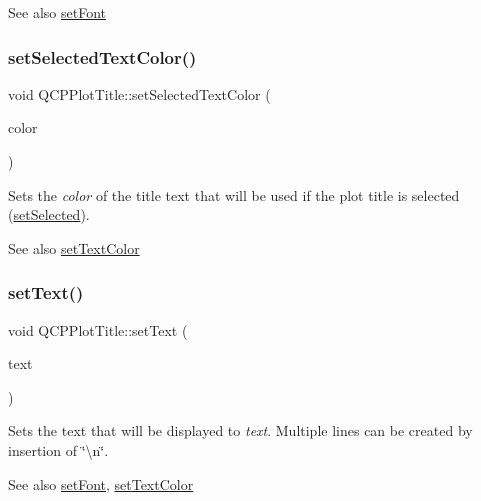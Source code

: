 \begin{DoxySeeAlso}{See also}
\mbox{\hyperlink{class_q_c_p_plot_title_a199fc7170802ea65006c371875349e37}{set\+Font}} 
\end{DoxySeeAlso}
\mbox{\label{class_q_c_p_plot_title_a09ffd8c52ac8824d00382f84be391b66}} 
\subsubsection{\texorpdfstring{set\+Selected\+Text\+Color()}{setSelectedTextColor()}}
{\footnotesize\ttfamily void Q\+C\+P\+Plot\+Title\+::set\+Selected\+Text\+Color (\begin{DoxyParamCaption}\item[{const Q\+Color \&}]{color }\end{DoxyParamCaption})}

Sets the {\itshape color} of the title text that will be used if the plot title is selected (\mbox{\hyperlink{class_q_c_p_plot_title_a8d441a889d371307df86f1ab7687a333}{set\+Selected}}).

\begin{DoxySeeAlso}{See also}
\mbox{\hyperlink{class_q_c_p_plot_title_a71273e3a0ca6b4c151591b37b9e5ce33}{set\+Text\+Color}} 
\end{DoxySeeAlso}
\mbox{\label{class_q_c_p_plot_title_aae5a93e88050dfb2cbf6adc087516821}} 
\subsubsection{\texorpdfstring{set\+Text()}{setText()}}
{\footnotesize\ttfamily void Q\+C\+P\+Plot\+Title\+::set\+Text (\begin{DoxyParamCaption}\item[{const Q\+String \&}]{text }\end{DoxyParamCaption})}

Sets the text that will be displayed to {\itshape text}. Multiple lines can be created by insertion of \char`\"{}\textbackslash{}n\char`\"{}.

\begin{DoxySeeAlso}{See also}
\mbox{\hyperlink{class_q_c_p_plot_title_a199fc7170802ea65006c371875349e37}{set\+Font}}, \mbox{\hyperlink{class_q_c_p_plot_title_a71273e3a0ca6b4c151591b37b9e5ce33}{set\+Text\+Color}} 
\end{DoxySeeAlso}
\mbox{\label{class_q_c_p_plot_title_a71273e3a0ca6b4c151591b37b9e5ce33}} 
